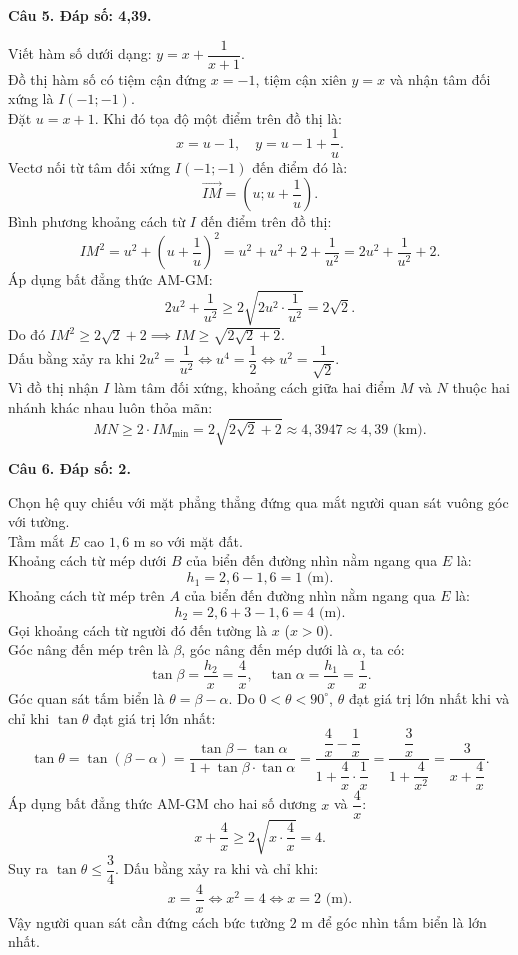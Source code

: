 \documentclass[12pt,a4paper]{article}
\newcommand{\loigiai}[1]{\par\medskip\Needspace{4\baselineskip}\noindent\textbf{#1}\par\nobreak}
\begin{document}
\loigiai{Câu 5. Đáp số: 4,39.}
Viết hàm số dưới dạng: $y = x + \dfrac{1}{x + 1}$.\\
Đồ thị hàm số có tiệm cận đứng $x = -1$, tiệm cận xiên $y = x$ và nhận tâm đối xứng là $I(-1; -1)$.\\
Đặt $u = x + 1$. Khi đó tọa độ một điểm trên đồ thị là:
\[x = u - 1,\quad y = u - 1 + \dfrac{1}{u}.\]
Vectơ nối từ tâm đối xứng $I(-1; -1)$ đến điểm đó là:
\[\vec{IM} = \left(u; u + \dfrac{1}{u}\right).\]
Bình phương khoảng cách từ $I$ đến điểm trên đồ thị:
\[IM^2 = u^2 + \left(u + \dfrac{1}{u}\right)^2 = u^2 + u^2 + 2 + \dfrac{1}{u^2} = 2u^2 + \dfrac{1}{u^2} + 2.\]
Áp dụng bất đẳng thức AM-GM:
\[2u^2 + \dfrac{1}{u^2} \ge 2\sqrt{2u^2 \cdot \dfrac{1}{u^2}} = 2\sqrt{2}.\]
Do đó $IM^2 \ge 2\sqrt{2} + 2 \implies IM \ge \sqrt{2\sqrt{2} + 2}$.\\
Dấu bằng xảy ra khi $2u^2 = \dfrac{1}{u^2} \iff u^4 = \dfrac{1}{2} \iff u^2 = \dfrac{1}{\sqrt{2}}$.\\
Vì đồ thị nhận $I$ làm tâm đối xứng, khoảng cách giữa hai điểm $M$ và $N$ thuộc hai nhánh khác nhau luôn thỏa mãn:
\[MN \ge 2 \cdot IM_{\min} = 2\sqrt{2\sqrt{2} + 2} \approx 4{,}3947 \approx 4{,}39\text{ (km)}.\]

\loigiai{Câu 6. Đáp số: 2.}
Chọn hệ quy chiếu với mặt phẳng thẳng đứng qua mắt người quan sát vuông góc với tường.\\
Tầm mắt $E$ cao $1{,}6\text{ m}$ so với mặt đất.\\
Khoảng cách từ mép dưới $B$ của biển đến đường nhìn nằm ngang qua $E$ là:
\[h_1 = 2{,}6 - 1{,}6 = 1\text{ (m)}.\]
Khoảng cách từ mép trên $A$ của biển đến đường nhìn nằm ngang qua $E$ là:
\[h_2 = 2{,}6 + 3 - 1{,}6 = 4\text{ (m)}.\]
Gọi khoảng cách từ người đó đến tường là $x$ ($x > 0$).\\
Góc nâng đến mép trên là $\beta$, góc nâng đến mép dưới là $\alpha$, ta có:
\[\tan \beta = \dfrac{h_2}{x} = \dfrac{4}{x},\quad \tan \alpha = \dfrac{h_1}{x} = \dfrac{1}{x}.\]
Góc quan sát tấm biển là $\theta = \beta - \alpha$. Do $0 < \theta < 90^\circ$, $\theta$ đạt giá trị lớn nhất khi và chỉ khi $\tan \theta$ đạt giá trị lớn nhất:
\[\tan \theta = \tan(\beta - \alpha) = \dfrac{\tan \beta - \tan \alpha}{1 + \tan \beta \cdot \tan \alpha} = \dfrac{\dfrac{4}{x} - \dfrac{1}{x}}{1 + \dfrac{4}{x} \cdot \dfrac{1}{x}} = \dfrac{\dfrac{3}{x}}{1 + \dfrac{4}{x^2}} = \dfrac{3}{x + \dfrac{4}{x}}.\]
Áp dụng bất đẳng thức AM-GM cho hai số dương $x$ và $\dfrac{4}{x}$:
\[x + \dfrac{4}{x} \ge 2\sqrt{x \cdot \dfrac{4}{x}} = 4.\]
Suy ra $\tan \theta \le \dfrac{3}{4}$. Dấu bằng xảy ra khi và chỉ khi:
\[x = \dfrac{4}{x} \iff x^2 = 4 \iff x = 2\text{ (m)}.\]
Vậy người quan sát cần đứng cách bức tường $2\text{ m}$ để góc nhìn tấm biển là lớn nhất.
\end{document}
